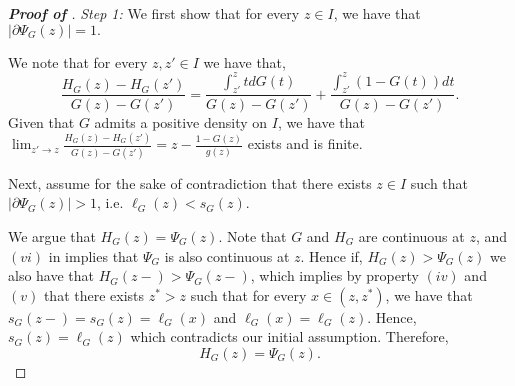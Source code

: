 \begin{proof}[\textbf{Proof of }]

\textit{Step 1:} We first show that for every $z \in I$, we have that $| \partial \Psi_{G}(z)| =1.$

    We note that for every $z,z' \in I$ we have that,
    \begin{equation*}
     \frac{H_{G}(z) - H_{G}(z')}{G(z)-G(z')} = \frac{\int_{z'}^z t dG(t)}{G(z) - G(z')} + \frac{\int_{z'}^z  (1-G(t))dt}{G(z) - G(z')}.
    \end{equation*}
    Given that $G$ admits a positive density on $I$, we have that $\lim_{z' \to z} \frac{H_{G}(z) - H_{G}(z')}{G(z)-G(z')} = z - \frac{1-G(z)}{g(z)}$ exists and is finite.

    Next, assume for the sake of contradiction that there exists $z \in I$ such that $| \partial \Psi_{G}(z)| > 1$, i.e. $\ell_{G}(z) < s_{G}(z)$. 

We argue that $H_{G}(z) = \Psi_{G}(z)$. 
Note that $G$ and $H_{G}$ are continuous at $z$, and $(vi)$ in  implies that $\Psi_{G}$ is also continuous at $z$.
Hence if, $H_{G}(z) > \Psi_{G}(z)$ we also have that $H_{G}(z-) > \Psi_{G}(z-)$, which implies by  property $(iv)$ and $(v)$ that there exists $z^* > z$ such that for every $x \in (z,z^*)$, we have that $s_{G}(z-) = s_{G}(z) = \ell_{G}(x)$  and $\ell_{G}(x) = \ell_{G}(z)$. Hence, $s_{G}(z) = \ell_{G}(z)$ which contradicts our initial assumption. Therefore,  
\begin{equation}
\label{eq:H_equal_Psi}
 H_{G}(z) = \Psi_{G}(z).
\end{equation}


\end{proof}
